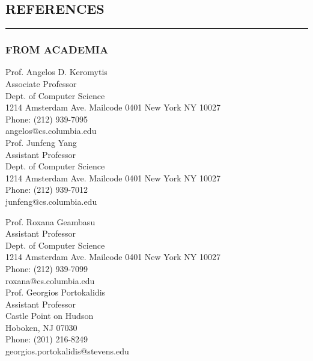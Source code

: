 \documentclass[10pt,a4]{article}
\begin{document}
\begin{small}
\subsection*{REFERENCES}
\hrule
\vspace{0.2cm}

\subsubsection*{FROM ACADEMIA}
\begin{footnotesize}

\begin{multicols}{2} 
\noindent 
Prof. Angelos D. Keromytis \\
Associate Professor \\
Dept. of Computer Science \\
1214 Amsterdam Ave. Mailcode 0401
New York NY 10027 \\
Phone: (212) 939-7095 \\
angelos@cs.columbia.edu \\

\noindent
Prof. Junfeng Yang\\
Assistant Professor \\
Dept. of Computer Science \\
1214 Amsterdam Ave. Mailcode 0401
New York NY 10027 \\
Phone: (212) 939-7012 \\
junfeng@cs.columbia.edu \\
\columnbreak

\noindent
Prof. Roxana Geambasu\\
Assistant Professor \\
Dept. of Computer Science \\
1214 Amsterdam Ave. Mailcode 0401
New York NY 10027 \\
Phone: (212) 939-7099 \\
roxana@cs.columbia.edu \\

\noindent
Prof. Georgios Portokalidis \\
Assistant Professor \\
Castle Point on Hudson \\
Hoboken, NJ 07030 \\
Phone: (201) 216-8249 \\
 georgios.portokalidis@stevens.edu \\
\end{multicols}

\end{footnotesize}
\end{small}
\end{document}
